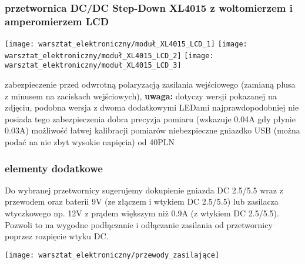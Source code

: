 \subsubsection{przetwornica DC/DC Step-Down XL4015 z woltomierzem i amperomierzem LCD}
	\begin{center}
		\texttt{[image: warsztat\_elektroniczny/moduł\_XL4015\_LCD\_1]}
		\hspace{0.5cm}
		\texttt{[image: warsztat\_elektroniczny/moduł\_XL4015\_LCD\_2]}
		\hspace{0.5cm}
		\texttt{[image: warsztat\_elektroniczny/moduł\_XL4015\_LCD\_3]}
	\end{center}
	\begin{itemize}
		\zaleta  zabezpieczenie przed odwrotną polaryzacją zasilania wejściowego (zamianą plusa z minusem na zaciskach wejściowych),
			\textbf{uwaga:} dotyczy wersji pokazanej na zdjęciu, podobna wersja z dwoma dodatkowymi LEDami najprawdopodobniej nie posiada tego zabezpieczenia
		\zaleta  dobra precyzja pomiaru (wskazuje 0.04A gdy płynie 0.03A)
		\zaleta  możliwość łatwej kalibracji pomiarów
		\wada niebezpieczne gniazdko USB (można podać na nie zbyt wysokie napięcia)
		\info od 40PLN
	\end{itemize}
	
\subsubsection{elementy dodatkowe}
Do wybranej przetwornicy sugerujemy dokupienie gniazda DC 2.5/5.5 wraz z przewodem oraz baterii 9V (ze złączem i wtykiem DC 2.5/5.5) lub zasilacza wtyczkowego np. 12V z prądem większym niż 0.9A (z wtykiem DC 2.5/5.5). Pozwoli to na wygodne podłączanie i odłączanie zasilania od przetwornicy poprzez rozpięcie wtyku DC.
\begin{center}
	\texttt{[image: warsztat\_elektroniczny/przewody\_zasilające]}
\end{center}
